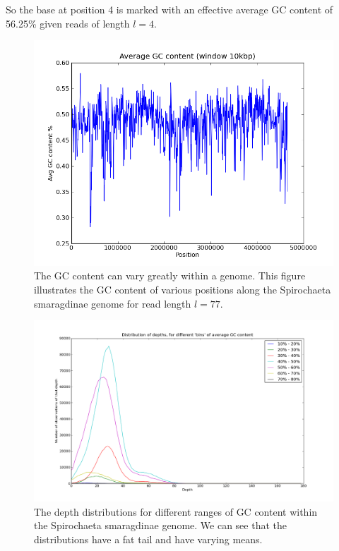 \documentclass[phd,tocprelim]{cornell}
\begin{document}
So the base at position 4 is marked with an effective average GC content of 56.25\% given reads of length $l=4$.

\begin{figure}[hptb]
    \centerline{\includegraphics[width=\textwidth]{figures/ALE/spiroGC.png}}
    \caption[GC content of Spirochaeta smaragdinae]{The GC content can vary greatly within a genome. This figure illustrates the GC content of various positions along the Spirochaeta smaragdinae genome for read length $l=77$.}\label{fig:GC2}
\end{figure}

\begin{figure}[hptb]
    \centerline{\includegraphics[width=\textwidth]{figures/ALE/DepthDistVsGC_564lib.png}}
    \caption[Depth distribution of different GC contents]{The depth distributions for different ranges of GC content within the Spirochaeta smaragdinae genome. We can see that the distributions have a fat tail and have varying means.}\label{fig:GC3}
\end{figure}
\end{document}
